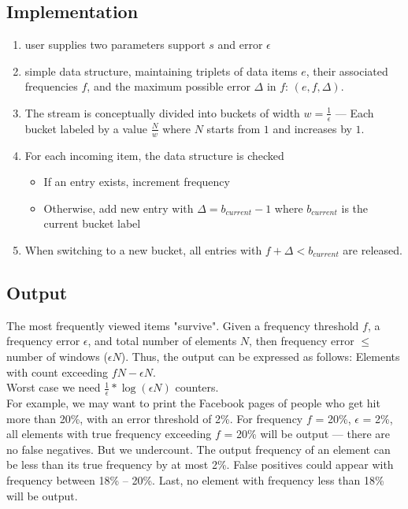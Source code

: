 \documentclass[a3paper, 12pt]{book} %
\begin{document}
\subsection{Implementation}
\begin{enumerate}
	\item user supplies two parameters support $s$ and error $\epsilon$
	\item simple data structure, maintaining triplets of data items $e$, their associated frequencies $f$, and the maximum possible error $\Delta$ in $f$: $(e, f, \Delta)$.
	\item The stream is conceptually divided into buckets of width $w=\frac{1}{\epsilon}$ --- Each bucket labeled by a value $\frac{N}{w}$ where $N$ starts from $1$ and increases by $1$.
	\item For each incoming item, the data structure is checked
	\begin{itemize}
		\item If an entry exists, increment frequency
		\item Otherwise, add new entry with $\Delta=b_{current}-1$ where $b_{current}$ is the current bucket label
	\end{itemize}  
	\item When switching to a new bucket, all entries with $f+\Delta < b_{current}$ are released.
\end{enumerate}

\subsection{Output}
The most frequently viewed items "survive". Given a frequency threshold $f$, a frequency error $\epsilon$, and total number of elements $N$, then frequency error $\le$ number of windows ($\epsilon N$). Thus, the output can be expressed as follows: Elements with count exceeding $fN - \epsilon N$. \\

Worst case we need $\frac{1}{\epsilon} * \log{(\epsilon N)}$ counters.\\

For example, we may want to print the Facebook pages of people who get hit more than 20\%, with an error threshold of 2\%. For frequency $f$ = 20\%, $\epsilon$ = 2\%, all elements with true frequency exceeding $f$ = 20\% will be output --- there are no false negatives. But we undercount. The output frequency of an element can be less than its true frequency by at most 2\%. False positives could appear with frequency between 18\% -- 20\%. Last, no element with frequency less than 18\% will be output.
\end{document}
